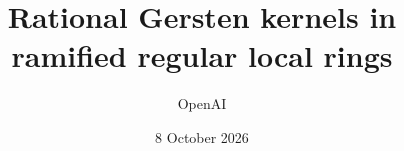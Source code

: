 \documentclass[11pt,a4paper]{amsart}
\title[Rational Gersten kernels]{Rational Gersten kernels in ramified regular local rings}
\author{OpenAI}
\date{8 October 2026}
\begin{document}
\begin{abstract}

\end{abstract}
\maketitle

\setcounter{tocdepth}{1}
\tableofcontents







\appendix



\end{document}
